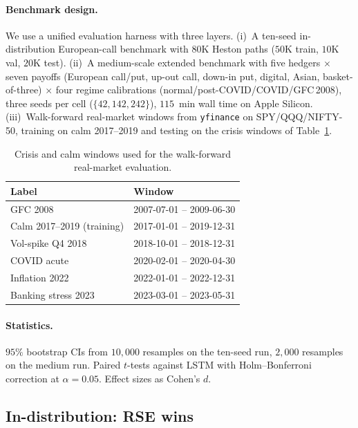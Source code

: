 \documentclass[11pt]{article}
\begin{document}
\paragraph{Benchmark design.}  We use a unified evaluation harness with three layers.  (i)~A ten-seed in-distribution European-call benchmark with $80$K Heston paths ($50$K train, $10$K val, $20$K test).  (ii)~A medium-scale extended benchmark with five hedgers $\times$ seven payoffs (European call/put, up-out call, down-in put, digital, Asian, basket-of-three) $\times$ four regime calibrations (normal/post-COVID/COVID/GFC$\,$2008), three seeds per cell ($\{42,142,242\}$), $115$~min wall time on Apple Silicon.  (iii)~Walk-forward real-market windows from \texttt{yfinance} on SPY/QQQ/NIFTY-50, training on calm 2017--2019 and testing on the crisis windows of Table~\ref{tab:crisis_windows}.

\begin{table}[ht]\centering\small
\caption{Crisis and calm windows used for the walk-forward real-market evaluation.}
\label{tab:crisis_windows}
\begin{tabular}{@{}ll@{}}
\toprule
\textbf{Label} & \textbf{Window} \\\midrule
GFC 2008 & 2007-07-01 -- 2009-06-30 \\
Calm 2017--2019 (training) & 2017-01-01 -- 2019-12-31 \\
Vol-spike Q4 2018 & 2018-10-01 -- 2018-12-31 \\
COVID acute & 2020-02-01 -- 2020-04-30 \\
Inflation 2022 & 2022-01-01 -- 2022-12-31 \\
Banking stress 2023 & 2023-03-01 -- 2023-05-31 \\
\bottomrule
\end{tabular}
\end{table}

\paragraph{Statistics.}  $95\%$ bootstrap CIs from $10{,}000$ resamples on the ten-seed run, $2{,}000$ resamples on the medium run.  Paired $t$-tests against LSTM with Holm--Bonferroni correction at $\alpha=0.05$.  Effect sizes as Cohen's $d$.

\subsection{In-distribution: RSE wins}
\end{document}
